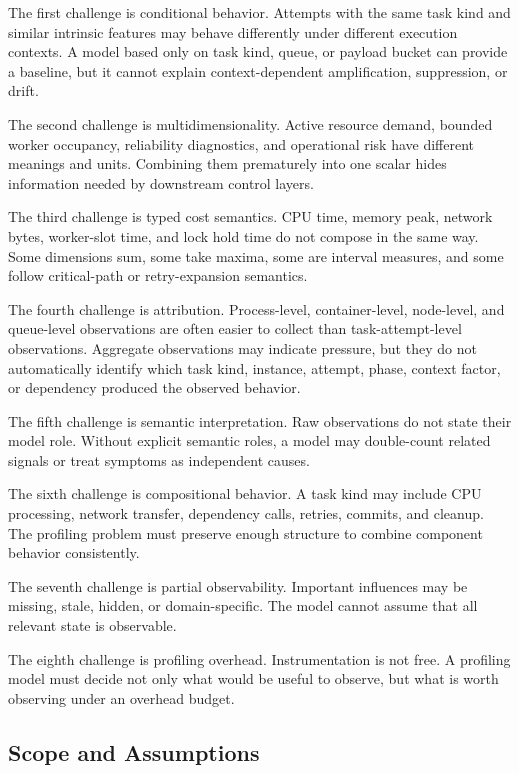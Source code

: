 The first challenge is conditional behavior. Attempts with the same task kind
and similar intrinsic features may behave differently under different execution
contexts. A model based only on task kind, queue, or payload bucket can provide a
baseline, but it cannot explain context-dependent amplification, suppression, or
drift.

The second challenge is multidimensionality. Active resource demand, bounded
worker occupancy, reliability diagnostics, and operational risk have different
meanings and units. Combining them prematurely into one scalar hides information
needed by downstream control layers.

The third challenge is typed cost semantics. CPU time, memory peak, network
bytes, worker-slot time, and lock hold time do not compose in the same way. Some
dimensions sum, some take maxima, some are interval measures, and some follow
critical-path or retry-expansion semantics.

The fourth challenge is attribution. Process-level, container-level, node-level,
and queue-level observations are often easier to collect than
task-attempt-level observations. Aggregate observations may indicate pressure,
but they do not automatically identify which task kind, instance, attempt,
phase, context factor, or dependency produced the observed behavior.

The fifth challenge is semantic interpretation. Raw observations do not state
their model role. Without explicit semantic roles, a model may double-count
related signals or treat symptoms as independent causes.

The sixth challenge is compositional behavior. A task kind may include CPU
processing, network transfer, dependency calls, retries, commits, and cleanup.
The profiling problem must preserve enough structure to combine component
behavior consistently.

The seventh challenge is partial observability. Important influences may be
missing, stale, hidden, or domain-specific. The model cannot assume that all
relevant state is observable.

The eighth challenge is profiling overhead. Instrumentation is not free. A
profiling model must decide not only what would be useful to observe, but what is
worth observing under an overhead budget.

\subsection{Scope and Assumptions}
\label{sec:problem-scope-assumptions}


